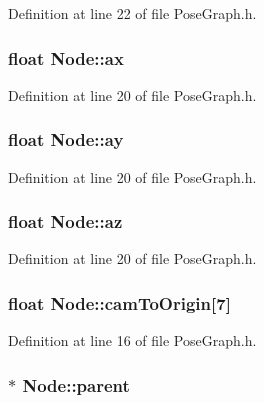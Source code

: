 \-Definition at line 22 of file \-Pose\-Graph.\-h.

\hypertarget{classNode_a8b0379c6d5f819d6f840d2e623c20f5d}{
\subsubsection[{ax}]{\setlength{\rightskip}{0pt plus 5cm}float {\bf \-Node\-::ax}}}\label{classNode_a8b0379c6d5f819d6f840d2e623c20f5d}


\-Definition at line 20 of file \-Pose\-Graph.\-h.

\hypertarget{classNode_a1815f050e4c4d0864255d33f05e992ea}{
\subsubsection[{ay}]{\setlength{\rightskip}{0pt plus 5cm}float {\bf \-Node\-::ay}}}\label{classNode_a1815f050e4c4d0864255d33f05e992ea}


\-Definition at line 20 of file \-Pose\-Graph.\-h.

\hypertarget{classNode_a55bba6ef3a51e6ab04e4e1612343335a}{
\subsubsection[{az}]{\setlength{\rightskip}{0pt plus 5cm}float {\bf \-Node\-::az}}}\label{classNode_a55bba6ef3a51e6ab04e4e1612343335a}


\-Definition at line 20 of file \-Pose\-Graph.\-h.

\hypertarget{classNode_a090a2028b74112aba3eb2126d99028aa}{
\subsubsection[{cam\-To\-Origin}]{\setlength{\rightskip}{0pt plus 5cm}float {\bf \-Node\-::cam\-To\-Origin}\mbox{[}7\mbox{]}}}\label{classNode_a090a2028b74112aba3eb2126d99028aa}


\-Definition at line 16 of file \-Pose\-Graph.\-h.

\hypertarget{classNode_ad8184598cdea70e4bbdfd76f2b0f9e85}{
\subsubsection[{parent}]{$\ast$ {\bf \-Node\-::parent}}}\label{classNode_ad8184598cdea70e4bbdfd76f2b0f9e85}


